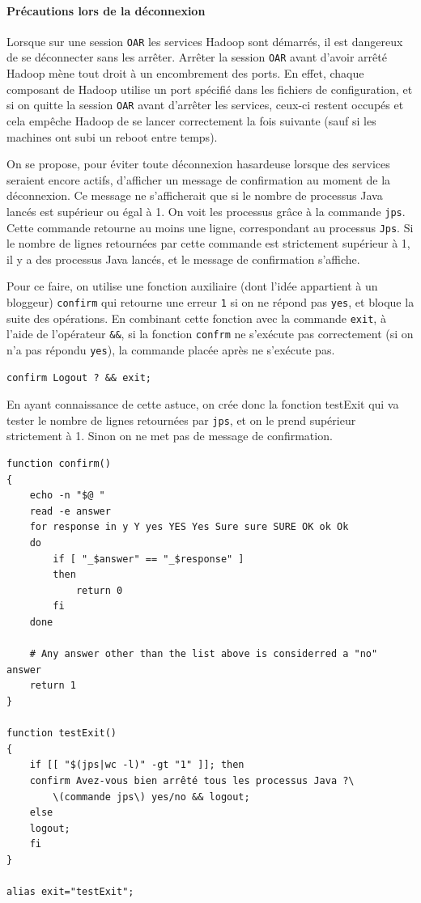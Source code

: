 \paragraph{Précautions lors de la déconnexion}
\label{sec:precautions-lors-de}

\par Lorsque sur une session \texttt{OAR} les services Hadoop sont démarrés, il est dangereux de se déconnecter sans les arrêter. Arrêter la session \texttt{OAR} avant d'avoir arrêté Hadoop mène tout droit à un encombrement des ports. En effet, chaque composant de Hadoop utilise un port spécifié dans les fichiers de configuration, et si on quitte la session \texttt{OAR} avant d'arrêter les services, ceux-ci restent occupés et cela empêche Hadoop de se lancer correctement la fois suivante (sauf si les machines ont subi un reboot entre temps).

\par On se propose, pour éviter toute déconnexion hasardeuse lorsque des services seraient encore actifs, d'afficher un message de confirmation au moment de la déconnexion. Ce message ne s'afficherait que si le nombre de processus Java lancés est supérieur ou égal à 1. On voit les processus grâce à la commande \texttt{jps}. Cette commande retourne au moins une ligne, correspondant au processus \texttt{Jps}. Si le nombre de lignes retournées par cette commande est strictement supérieur à 1, il y a des processus Java lancés, et le message de confirmation s'affiche.

\par Pour ce faire, on utilise une fonction auxiliaire (dont l'idée appartient à un bloggeur) \texttt{confirm} qui retourne une erreur \texttt{1} si on ne répond pas \texttt{yes}, et bloque la suite des opérations. En combinant cette fonction avec la commande \texttt{exit}, à l'aide de l'opérateur \texttt{&&}, si la fonction \texttt{confrm} ne s'exécute pas correctement (si on n'a pas répondu \texttt{yes}), la commande placée après ne s'exécute pas.
\begin{verbatim}
confirm Logout ? && exit;
\end{verbatim}

\par En ayant connaissance de cette astuce, on crée donc la fonction testExit qui va tester le nombre de lignes retournées par \texttt{jps}, et on le prend supérieur strictement à 1. Sinon on ne met pas de message de confirmation.
\begin{verbatim}
function confirm()
{
    echo -n "$@ "
    read -e answer
    for response in y Y yes YES Yes Sure sure SURE OK ok Ok
    do
        if [ "_$answer" == "_$response" ]
        then
            return 0
        fi
    done
 
    # Any answer other than the list above is considerred a "no" answer
    return 1
}

function testExit()
{
    if [[ "$(jps|wc -l)" -gt "1" ]]; then
	confirm Avez-vous bien arrêté tous les processus Java ?\ 
        \(commande jps\) yes/no && logout;
    else
	logout;
    fi
}

alias exit="testExit";
\end{verbatim}

